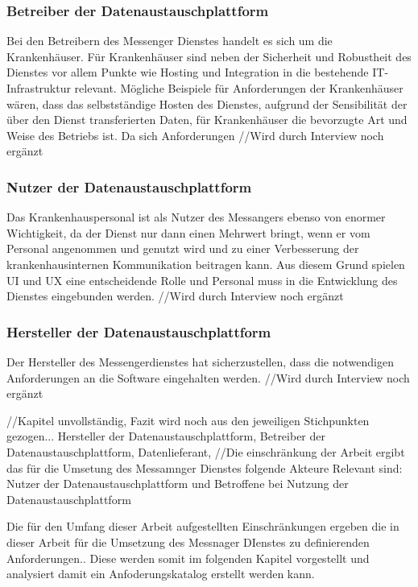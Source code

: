 \subsubsection{Betreiber der Datenaustauschplattform}\label{subsection:bdd}
Bei den Betreibern des Messenger Dienstes handelt es sich um die Krankenhäuser. Für Krankenhäuser sind neben der Sicherheit und Robustheit des Dienstes vor allem Punkte wie Hosting und Integration in die bestehende IT-Infrastruktur relevant.
Mögliche Beispiele für Anforderungen der Krankenhäuser wären, dass das selbstständige Hosten des Dienstes, aufgrund der Sensibilität der über den Dienst transferierten Daten, für Krankenhäuser die bevorzugte Art und Weise des Betriebs ist. Da sich Anforderungen 
//Wird durch Interview noch ergänzt

\subsubsection{Nutzer der Datenaustauschplattform}\label{subsection:ndd}
Das Krankenhauspersonal ist als Nutzer des Messangers ebenso von enormer Wichtigkeit, da der Dienst nur dann einen Mehrwert bringt, wenn er vom Personal angenommen und genutzt wird und zu einer Verbesserung der krankenhausinternen Kommunikation beitragen kann. Aus diesem Grund spielen UI und UX eine entscheidende Rolle und Personal muss in die Entwicklung des Dienstes eingebunden werden.
//Wird durch Interview noch ergänzt

\subsubsection{Hersteller der Datenaustauschplattform}\label{subsection:hdd}
Der Hersteller des Messengerdienstes hat sicherzustellen, dass die notwendigen Anforderungen an die Software eingehalten werden.
//Wird durch Interview noch ergänzt

//Kapitel unvollständig, Fazit wird noch aus den jeweiligen Stichpunkten gezogen...
Hersteller der Datenaustauschplattform, Betreiber der Datenaustauschplattform, Datenlieferant, 
//Die einschränkung der Arbeit ergibt das für die Umsetung des Messamnger Dienstes folgende Akteure Relevant sind: Nutzer der Datenaustauschplattform und Betroffene bei Nutzung der Datenaustauschplattform

Die für den Umfang dieser Arbeit aufgestellten Einschränkungen ergeben die in dieser Arbeit für die Umsetzung des Messnager DIenstes zu definierenden Anforderungen..
Diese werden somit im folgenden Kapitel vorgestellt und analysiert damit ein Anfoderungskatalog erstellt werden kann.

